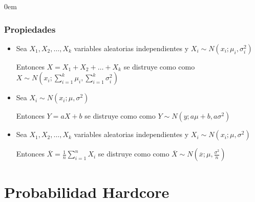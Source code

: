 \documentclass[12pt, fleqn]{report}                             %
\newenvironment{SmallIndentation}[1][0.75em]                    %
        {\begin{adjustwidth}{#1}{}\begin{footnotesize}}             %
        {\end{footnotesize}\end{adjustwidth}}                       %
\newcommand \Over {\overline}                                   %
\theoremstyle{break}                                            %
\begin{document}
\begin{multicols}{2}
\begin{SmallIndentation}[0em]
                    \subsubsection{Propiedades}

                        \begin{itemize}

                            \item 
                                Sea $X_1, X_2, \dots, X_k$ variables aleatorias independientes
                                y $X_i \sim N(x_i; \mu_i, \sigma_i^2)$  

                                Entonces $X = X_1 + X_2 + \dots + X_k$ se distruye como
                                como $X \sim N(x_i; \sum_{i=1}^k \mu_i, \sum_{i=1}^k \sigma_i^2)$

                            \item 
                                Sea $X_i \sim N(x_i; \mu, \sigma^2)$  

                                Entonces $Y = aX + b$ se distruye como
                                como $Y \sim N(y; a\mu + b, a\sigma^2)$

                            \item 
                                Sea $X_1, X_2, \dots, X_k$ variables aleatorias independientes
                                y $X_i \sim N(x_i; \mu, \sigma^2)$  

                                Entonces $\Over{X} = \frac{1}{n} \sum_{i=1}^n X_i$ se distruye como
                                como $\Over{X} \sim N(\Over{x}; \mu, \frac{\sigma^2}{n})$

                        \end{itemize}
                    

                \end{SmallIndentation}
                \end{multicols}



        \clearpage
        \section{Probabilidad Hardcore}
\end{document}
